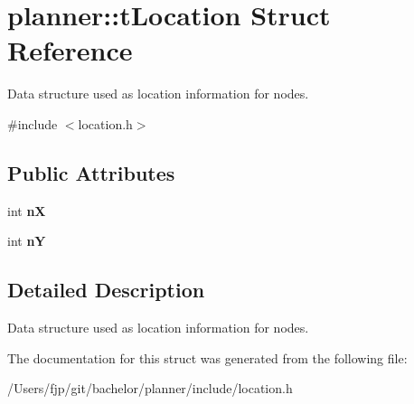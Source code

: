 \hypertarget{structplanner_1_1t_location}{}\section{planner\+:\+:t\+Location Struct Reference}
\label{structplanner_1_1t_location}


Data structure used as location information for nodes.  




{\ttfamily \#include $<$location.\+h$>$}

\subsection*{Public Attributes}
\begin{DoxyCompactItemize}
\item 
\mbox{\label{structplanner_1_1t_location_aca6603f36eb5d71b738ec085080d4f76}} 
int {\bfseries nX}
\item 
\mbox{\label{structplanner_1_1t_location_a83bc1d843b7603e1fc9913001b41421a}} 
int {\bfseries nY}
\end{DoxyCompactItemize}


\subsection{Detailed Description}
Data structure used as location information for nodes. 

The documentation for this struct was generated from the following file\+:\begin{DoxyCompactItemize}
\item 
/\+Users/fjp/git/bachelor/planner/include/location.\+h\end{DoxyCompactItemize}
